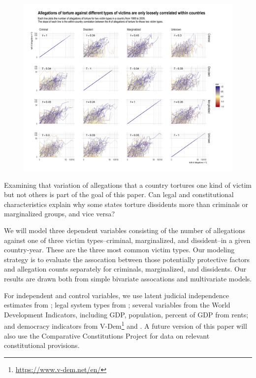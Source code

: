 \documentclass[12pt]{article}
\begin{document}
\begin{figure}
\begin{center}
\caption{}
\label{fig:correlation-matrix}
\includegraphics[width=.99\textwidth]{../output/allegations-by-victim-scatterplots.png}
\end{center}
\end{figure}

Examining that variation of allegations that a country tortures one kind of victim but not others is part of the goal of this paper. Can legal and constitutional characteristics explain why some states torture dissidents more than criminals or marginalized groups, and vice versa?

We will model three dependent variables consisting of the number of allegations against one of three victim types--criminal, marginalized, and dissident--in a given country-year. These are the three most common victim types. Our modeling strategy is to evaluate the assocation between those potentially protective factors and allegation counts separately for criminals, marginalized, and dissidents. Our results are drawn both from simple bivariate assocations and multivariate models. 

For independent and control variables, we use latent judicial independence estimates from \citet{linzer2015global}; legal system types from \citet{mitchell2013domestic}; several variables from the World Development Indicators, including GDP, population, percent of GDP from rents; and democracy indicators from V-Dem\footnote{\url{https://www.v-dem.net/en/}} and \citet{cheibub2010democracy}. A future version of this paper will also use the Comparative Constitutions Project for data on relevant constitutional provisions. 
\end{document}
